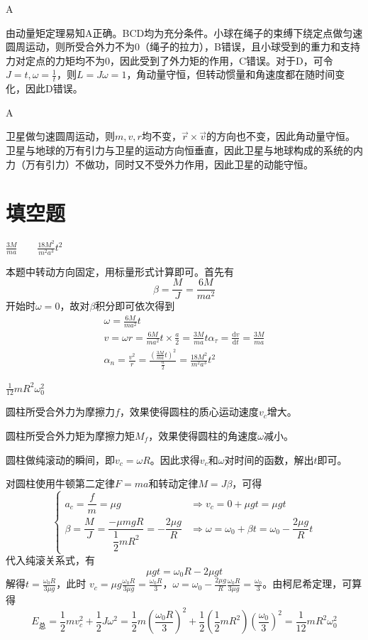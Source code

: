 \documentclass[b5paper,opensource,sourcefont,parskip]{qyxf-book}
\newcommand{\di}[1]{\mathrm{d}#1}
\newcommand{\dy}[2]{\frac{\di{#1}}{\di{#2}}}
\begin{document}
A

\solve 由动量矩定理易知A正确。BCD均为充分条件。小球在绳子的束缚下绕定点做匀速圆周运动，则所受合外力不为0（绳子的拉力），B错误，且小球受到的重力和支持力对定点的力矩均不为0，因此受到了外力矩的作用，C错误。对于D，可令$ J=t,\omega=\frac{1}{t} $，则$ L=J\omega=1 $，角动量守恒，但转动惯量和角速度都在随时间变化，因此D错误。
			
A

\solve 卫星做匀速圆周运动，则$ m,v,r $均不变，$ \vec{r}\times\vec{v} $的方向也不变，因此角动量守恒。卫星与地球的万有引力与卫星的运动方向恒垂直，因此卫星与地球构成的系统的内力（万有引力）不做功，同时又不受外力作用，因此卫星的动能守恒。

\section{填空题}
$\frac{3M}{ma} \hspace{2em} \frac{18M^2}{m^2a^3}t^2$

\solve 本题中转动方向固定，用标量形式计算即可。首先有
\[\beta=\frac{M}{J}=\frac{6M}{ma^2}\]
开始时$\omega=0$，故对$\beta$积分即可依次得到
\begin{gather*}
\omega=\frac{6M}{ma^2}t\\
v=\omega r=\frac{6M}{ma^2}t\times\frac{a}{2}=\frac{3M}{ma}t
\alpha_{\tau}=\dy{v}{t}=\frac{3M}{ma}\\
\alpha_n=\frac{v^2}{r}=\frac{\left(\frac{3M}{ma}t\right)^2}{\frac{a}{2}}=\frac{18M^2}{m^2a^3}t^2
\end{gather*}


$\frac{1}{12}mR^2\omega_0^2$

\solve 圆柱所受合外力为摩擦力$f$，效果使得圆柱的质心运动速度$ v_c $增大。

圆柱所受合外力矩为摩擦力矩$ M_f $，效果使得圆柱的角速度$ \omega $减小。

圆柱做纯滚动的瞬间，即$ v_c=\omega R $。因此求得$ v_c $和$ \omega $对时间的函数，解出$ t $即可。

对圆柱使用牛顿第二定律$F=ma$和转动定律$M=J\beta$，可得
\[\begin{cases}
a_c=\dfrac{f}{m}=\mu g&\Rightarrow v_c=0+\mu gt=\mu gt\\[0.5cm]
\beta=\dfrac{M}{J}=\dfrac{-\mu mgR}{\dfrac{1}{2}mR^2}=-\dfrac{2\mu g}{R}&\Rightarrow\omega=\omega_0+\beta t=\omega_0-\dfrac{2\mu g}{R}t
\end{cases}\]
代入纯滚关系式，有
\[\mu gt=\omega_0R-2\mu gt\]
解得$t=\frac{\omega_0R}{3\mu g}$，此时
$v_c=\mu g\frac{\omega_0R}{3\mu g}=\frac{\omega_0R}{3}$，$\omega=\omega_0-\frac{2\mu g}{R}\frac{\omega_0R}{3\mu g}=\frac{\omega_0}{3}$。由柯尼希定理，可算得
\[E_{\text{总}}=\frac{1}{2}mv_c^2+\frac{1}{2}J\omega^2=\frac{1}{2}m\left(\frac{\omega_0R}{3}\right)^2+\frac{1}{2}\left(\frac{1}{2}mR^2\right)\left(\frac{\omega_0}{3}\right)^2=\frac{1}{12}mR^2\omega_0^2\]
\end{document}
